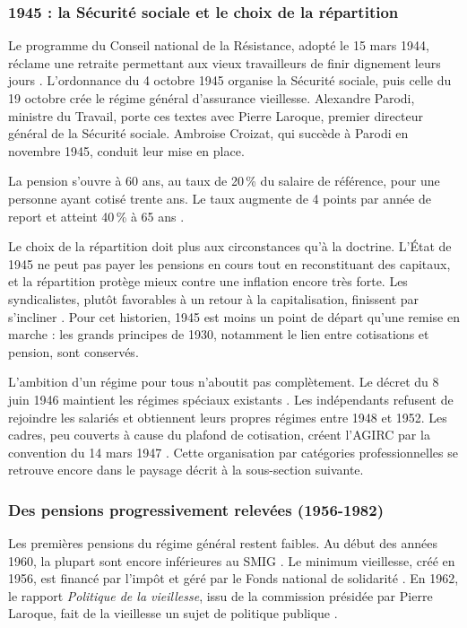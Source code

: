 \subsubsection{1945 : la Sécurité sociale et le choix de la répartition}

Le programme du Conseil national de la Résistance, adopté le 15 mars 1944, réclame \og une retraite permettant aux vieux travailleurs de finir dignement leurs jours \fg{}. L'ordonnance du 4 octobre 1945 organise la Sécurité sociale, puis celle du 19 octobre crée le régime général d'assurance vieillesse. Alexandre Parodi, ministre du Travail, porte ces textes avec Pierre Laroque, premier directeur général de la Sécurité sociale. Ambroise Croizat, qui succède à Parodi en novembre 1945, conduit leur mise en place.

La pension s'ouvre à 60 ans, au taux de 20\,\% du salaire de référence, pour une personne ayant cotisé trente ans. Le taux augmente de 4 points par année de report et atteint 40\,\% à 65 ans \cite{cfdt}.

Le choix de la répartition doit plus aux circonstances qu'à la doctrine. L'État de 1945 ne peut pas payer les pensions en cours tout en reconstituant des capitaux, et la répartition protège mieux contre une inflation encore très forte. Les syndicalistes, plutôt favorables à un retour à la capitalisation, finissent par s'incliner \cite{valat2022}. Pour cet historien, 1945 est moins un point de départ qu'une remise en marche : les grands principes de 1930, notamment le lien entre cotisations et pension, sont conservés.

L'ambition d'un régime pour tous n'aboutit pas complètement. Le décret du 8 juin 1946 maintient les régimes spéciaux existants \cite{cor2022}. Les indépendants refusent de rejoindre les salariés et obtiennent leurs propres régimes entre 1948 et 1952. Les cadres, peu couverts à cause du plafond de cotisation, créent l'AGIRC par la convention du 14 mars 1947 \cite{valat2022}. Cette organisation par catégories professionnelles se retrouve encore dans le paysage décrit à la sous-section suivante.

\subsubsection{Des pensions progressivement relevées (1956-1982)}

Les premières pensions du régime général restent faibles. Au début des années 1960, la plupart sont encore inférieures au SMIG \cite{valat2022}. Le minimum vieillesse, créé en 1956, est financé par l'impôt et géré par le Fonds national de solidarité \cite{retraiteenclair}. En 1962, le rapport \textit{Politique de la vieillesse}, issu de la commission présidée par Pierre Laroque, fait de la vieillesse un sujet de politique publique \cite{conseiletat}.

